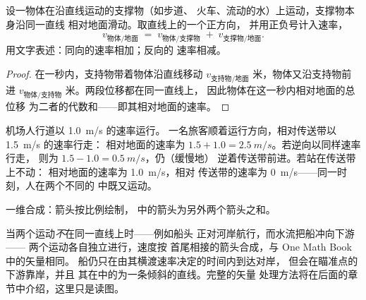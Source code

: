 \begin{proposition}[一维速率的合成]\label{prop:g10:relative-motion:compose}
设一物体在沿直线运动的支撑物（如步道、
火车、流动的水）上运动，支撑物本身沿同一直线
相对地面滑动。取直线上的一个正方向，
并用正负号计入速率，
\[
v_{\text{物体/地面}} \;=\; v_{\text{物体/支撑物}} \;+\;
v_{\text{支撑物/地面}} .
\]
用文字表述：同向的速率相加；反向的
速率相减。
\end{proposition}

\begin{proof}
在一秒内，支持物带着物体沿直线移动 $v_{\text{支持物/地面}}$
米，物体又沿支持物前进 $v_{\text{物体/支持物}}$
米。两段位移都在同一直线上，
因此物体在这一秒内相对地面的总位移
为二者的代数和——即其相对地面的速率。
\end{proof}

\begin{example}[移动人行道]\label{ex:g10:relative-motion:walkway}
机场人行道以 \qty{1.0}{m/s} 的速率运行。
一名旅客顺着运行方向，相对传送带以 \qty{1.5}{m/s} 的速率行走：
相对地面的速率为 $1.5 + 1.0 = \qty{2.5}{m/s}$。若逆向以同样速率行走，
则为 $1.5 - 1.0 = \qty{0.5}{m/s}$，仍（缓慢地）
逆着传送带前进。若站在传送带上不动：
相对地面的速率为 \qty{1.0}{m/s}，相对
传送带的速率为 \qty{0}{m/s}——同一时刻，人在两个不同的
中既又运动。
\end{example}

\begin{omfigure}

{\small 一维合成：箭头按比例绘制，
中的箭头为另外两个箭头之和。}
\end{omfigure}

\begin{remark}[两个方向同时存在]\label{rem:g10:relative-motion:twodim}
当两个运动\emph{不}在同一直线上时——例如船头
正对河岸航行，而水流把船冲向下游——
两个运动各自独立进行，速度按
首尾相接的箭头合成，与 One Math Book 中的矢量相同。
船仍只在由其横渡速率决定的时间内到达对岸，
但会在瞄准点的下游靠岸，并且
其在中的为一条倾斜的直线。完整的矢量
处理方法将在后面的章节中介绍，这里只是读图。
\end{remark}


